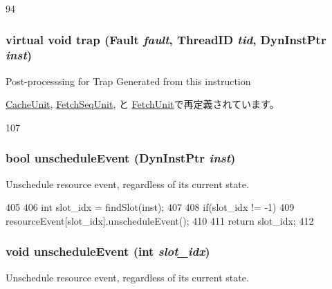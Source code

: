 \begin{DoxyCode}
94 { }
\end{DoxyCode}
\hypertarget{classResource_a1eb2a0229740a87bde0282416035b864}{
\subsubsection[{trap}]{\setlength{\rightskip}{0pt plus 5cm}virtual void trap ({\bf Fault} {\em fault}, \/  {\bf ThreadID} {\em tid}, \/  {\bf DynInstPtr} {\em inst})}}
\label{classResource_a1eb2a0229740a87bde0282416035b864}
Post-\/processsing for Trap Generated from this instruction 

\hyperlink{classCacheUnit_abf76d6d245f7d3b17d26ea8dcc0cf36f}{CacheUnit}, \hyperlink{classFetchSeqUnit_abf76d6d245f7d3b17d26ea8dcc0cf36f}{FetchSeqUnit}, と \hyperlink{classFetchUnit_abf76d6d245f7d3b17d26ea8dcc0cf36f}{FetchUnit}で再定義されています。


\begin{DoxyCode}
107 { }
\end{DoxyCode}
\hypertarget{classResource_a2ca5964896e91fdb616377369e29cfc4}{
\subsubsection[{unscheduleEvent}]{\setlength{\rightskip}{0pt plus 5cm}bool unscheduleEvent ({\bf DynInstPtr} {\em inst})}}
\label{classResource_a2ca5964896e91fdb616377369e29cfc4}
Unschedule resource event, regardless of its current state. 


\begin{DoxyCode}
405 {
406     int slot_idx = findSlot(inst);
407 
408     if(slot_idx != -1)
409         resourceEvent[slot_idx].unscheduleEvent();
410 
411     return slot_idx;
412 }
\end{DoxyCode}
\hypertarget{classResource_a30247366c4c8cb82c2a196a286d309ad}{
\subsubsection[{unscheduleEvent}]{\setlength{\rightskip}{0pt plus 5cm}void unscheduleEvent (int {\em slot\_\-idx})}}
\label{classResource_a30247366c4c8cb82c2a196a286d309ad}
Unschedule resource event, regardless of its current state. 


